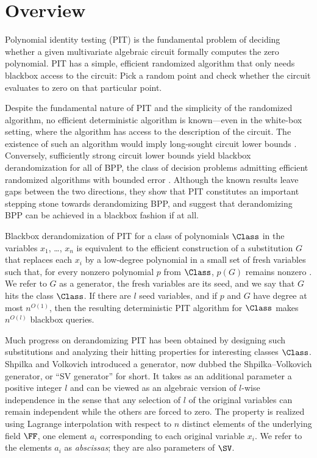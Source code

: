 
%
%
%


%
%
%

\section{Overview}
\label{s.intro}

Polynomial identity testing (PIT) is the fundamental problem of deciding
whether a given multivariate algebraic circuit formally computes the zero
polynomial.
PIT has a simple, efficient randomized algorithm that only needs blackbox
access to the circuit:
Pick a random point and check whether the circuit evaluates to zero on that
particular point.

Despite the fundamental nature of PIT and the simplicity of the randomized
algorithm,
no efficient deterministic algorithm is known---even in the white-box setting,
where the algorithm has access to the description of the circuit.
The existence of such an algorithm would imply long-sought circuit lower
bounds \cite{HeintzSchnorr1980, Agrawal2005, KabanetsImpagliazzo2004}.
Conversely, sufficiently strong circuit lower bounds yield blackbox
derandomization for all of BPP,
the class of decision problems admitting efficient randomized algorithms with
bounded error \cite{NisanWigderson1994,ImpagliazzoWigderson1997}.
Although the known results leave gaps between the two directions, they 
show that PIT constitutes an important stepping stone towards derandomizing BPP, and 
suggest that derandomizing BPP can be achieved in a blackbox fashion if at all.

Blackbox derandomization of PIT for a class of polynomials $\Class$ in the
variables \(x_1\), \ldots, \(x_n\) is equivalent to the efficient
construction of a substitution $G$ that replaces each \(x_i\) by a
low-degree polynomial in a small set of fresh variables
such that, for every nonzero polynomial $p$ from $\Class$,
$p(G)$ remains nonzero {\cite[Lemma 4.1]{ShpilkaYehudayoff2010}}.
We refer to \(G\) as a generator,
the fresh variables are its seed,
and we say that $G$ hits the class $\Class$.
If there are \(l\) seed variables,
and if $p$ and $G$ have degree at most $n^{O(1)}$,
then the resulting deterministic PIT algorithm for $\Class$ makes $n^{O(l)}$
blackbox queries.

Much progress on derandomizing PIT has been obtained by designing such substitutions and analyzing their hitting properties for interesting classes $\Class$.
Shpilka and Volkovich \cite{ShpilkaVolkovich2008} introduced a generator, now dubbed the Shpilka--Volkovich generator, or ``SV generator'' for short. It takes as an additional parameter a positive integer $l$ and can be viewed as an algebraic version of  $l$-wise independence in the sense that any selection of $l$ of the original variables can remain independent while the others are forced to zero. The property is realized using Lagrange interpolation with respect to $n$ distinct elements of the underlying field $\FF$, one element $a_i$ corresponding to each original variable $x_i$. We refer to the elements $a_i$ as \emph{abscissas}; they are also parameters of $\SV$.

